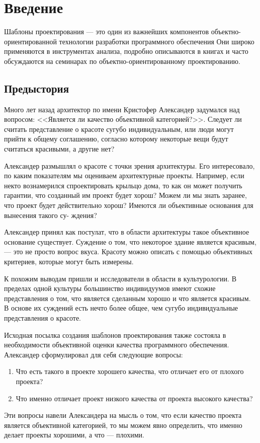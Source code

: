 \documentclass[10pt]{article}
\begin{document}
\section{Введение}
Шаблоны проектирования --- это один из важнейших компонентов объектно-
ориентированной технологии разработки программного обеспечения Они широко
применяются в инструментах анализа, подробно описываются в книгах и часто
обсуждаются на семинарах по объектно-ориентированному проектированию.

\subsection{Предыстория}
Много лет назад архитектор по имени Кристофер Александер задумался над вопросом:
<<Является ли качество объективной категорией?>>. Следует ли считать представление
о красоте сугубо индивидуальным, или люди могут прийти к общему соглашению,
согласно которому некоторые вещи будут считаться красивыми, а другие нет?

Александер размышлял о красоте с точки зрения архитектуры. Его интересовало, по
каким показателям мы оцениваем архитектурные проекты. Например, если некто
вознамерился спроектировать крыльцо дома, то как он может получить гарантии, что
созданный им проект будет хорош? Можем ли мы знать заранее, что проект будет
действительно хорош? Имеются ли объективные основания для вынесения такого су-
ждения?

Александер принял как постулат, что в области архитектуры такое объективное
основание существует. Суждение о том, что некоторое здание является красивым,--- 
это не просто вопрос вкуса. Красоту можно описать с помощью объективных
критериев, которые могут быть измерены.

К похожим выводам пришли и исследователи в области в культурологии. В пределах
одной культуры большинство индивидуумов имеют схожие представления о том,
что является сделанным хорошо и что является красивым. В основе их суждений есть
нечто более общее, чем сугубо индивидуальные представления о красоте.

Исходная посылка создания шаблонов проектирования также состояла в необходимости
объективной оценки качества программного обеспечения.
Александер сформулировал для себя следующие вопросы:
\begin{enumerate}
	\item Что есть такого в проекте хорошего качества, что отличает его от плохого проекта?
	\item Что именно отличает проект низкого качества от проекта высокого качества?
\end{enumerate}
Эти вопросы навели Александера на мысль о том, что если качество проекта является
объективной категорией, то мы можем явно определить, что именно делает проекты
хорошими, а что --- плохими.
\end{document}
